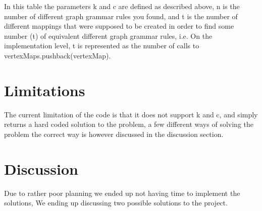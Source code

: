 \documentclass[a4paper,10pt,titlepage]{report}
\begin{document}
\newpage
In this table the parameters k and c are defined as described above, n is the number of different graph grammar rules you found, and t is the number of different mappings that were supposed to be created in order to find some number (t) of equivalent different graph grammar rules, i.e. On the implementation level, t is represented as the number of calls to vertexMaps.pushback(vertexMap). 

\section {Limitations}
The current limitation of the code is that it does not support k and c, and simply returns a hard coded solution to the problem, a few different ways of solving the problem the correct way is however discussed in the discussion section. 

\section{Discussion}
Due to rather poor planning we ended up not having time to implement the solutions, We ending up discussing two possible solutions to the project.
\end{document}
